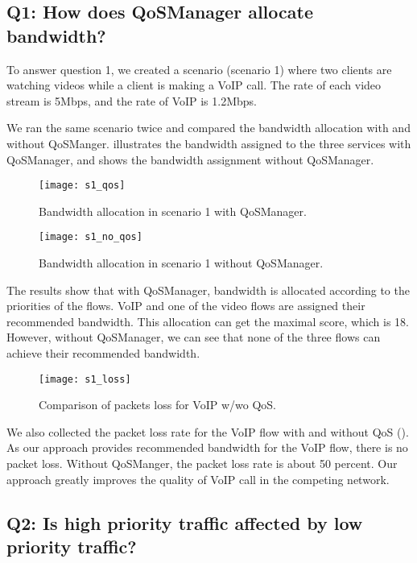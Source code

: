 \subsection{Q1: How does QoSManager allocate bandwidth?}

To answer question 1, we created a scenario (scenario 1) where two clients are watching videos while a client is making a VoIP call. The rate of each video stream is 5Mbps, and
the rate of VoIP is 1.2Mbps.

We ran the same scenario twice and compared the bandwidth allocation with and without QoSManger.  illustrates the bandwidth assigned to the three services with
QoSManager, and  shows the bandwidth assignment without QoSManager. 

\begin{figure}[htb]
\centering
\texttt{[image: s1\_qos]}
\caption{Bandwidth allocation in scenario 1 with QoSManager.}
\label{fig:s1_qos}
\end{figure}

\begin{figure}[htb]
\centering
\texttt{[image: s1\_no\_qos]}
\caption{Bandwidth allocation in scenario 1 without QoSManager.}
\label{fig:s1_no_qos}
\end{figure}

The results show that with QoSManager, bandwidth is allocated according to the priorities of the flows. VoIP and one of the video flows are assigned their recommended bandwidth.
This allocation can get the maximal score, which is 18. However, without QoSManager, we can see that none of the three flows can achieve their recommended bandwidth. 

\begin{figure}[htb]
\centering
\texttt{[image: s1\_loss]}
\caption{Comparison of packets loss for VoIP w/wo QoS.}
\label{fig:s1_loss}
\end{figure}

We also collected the packet loss rate for the VoIP flow with and without QoS (). As our approach provides recommended bandwidth for the VoIP flow, there is no packet loss.
Without QoSManger, the packet loss rate is about 50 percent. Our approach greatly improves the quality of VoIP call in the competing network.

\subsection{Q2: Is high priority traffic affected by low priority traffic?}

